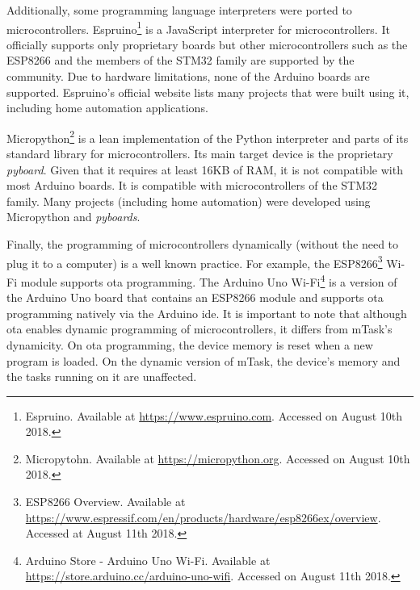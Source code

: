 Additionally, some programming language interpreters were ported to microcontrollers. Espruino\footnote{Espruino. Available at \url{https://www.espruino.com}. Accessed on August 10th 2018.} is a JavaScript interpreter for microcontrollers. It officially supports only proprietary boards but other microcontrollers such as the ESP8266 and the members of the STM32 family are supported by the community. Due to hardware limitations, none of the Arduino boards are supported. Espruino's official website lists many projects that were built using it, including home automation applications. 

Micropython\footnote{Micropytohn. Available at \url{https://micropython.org}. Accessed on August 10th 2018.} is a lean implementation of the Python interpreter and parts of its standard library for microcontrollers. Its main target device is the proprietary \textit{pyboard}. Given that it requires at least 16KB of RAM, it is not compatible with most Arduino boards. It is compatible with microcontrollers of the STM32 family. Many projects (including home automation) were developed using Micropython and \textit{pyboards}. 

Finally, the programming of microcontrollers dynamically (without the need to plug it to a computer) is a well known practice. For example, the ESP8266\footnote{ESP8266 Overview. Available at \url{https://www.espressif.com/en/products/hardware/esp8266ex/overview}. Accessed at August 11th 2018.} Wi-Fi module supports \ac{ota} programming. The Arduino Uno Wi-Fi\footnote{Arduino Store - Arduino Uno Wi-Fi. Available at \url{https://store.arduino.cc/arduino-uno-wifi}. Accessed on August 11th 2018.} is a version of the Arduino Uno board that contains an ESP8266 module and supports \ac{ota} programming natively via the Arduino \acs{ide}. It is important to note that although \ac{ota} enables dynamic programming of microcontrollers, it differs from mTask's dynamicity. On \ac{ota} programming, the device memory is reset when a new program is loaded. On the dynamic version of mTask, the device's memory and the tasks running on it are unaffected.